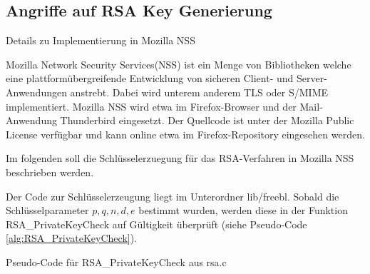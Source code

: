 
\newtext


\subsection{Angriffe auf RSA Key Generierung}

Details zu Implementierung in Mozilla NSS

Mozilla Network Security Services(NSS) ist ein Menge von Bibliotheken welche eine plattformübergreifende Entwicklung von sicheren Client- und Server-Anwendungen anstrebt. Dabei wird unterem anderem TLS oder S/MIME implementiert. Mozilla NSS wird etwa im Firefox-Browser und der Mail-Anwendung Thunderbird eingesetzt.
Der Quellcode ist unter der Mozilla Public License verfügbar und kann online etwa im Firefox-Repository \cite{MozillaDXR} eingesehen werden.

Im folgenden soll die Schlüsselerzuegung für das RSA-Verfahren in Mozilla NSS beschrieben werden.

Der Code zur Schlüsselerzeugung liegt im Unterordner lib/freebl. Sobald die Schlüsselparameter $p,q,n,d,e$ bestimmt wurden, werden diese in der Funktion RSA_PrivateKeyCheck auf Gültigkeit überprüft (siehe Pseudo-Code \ref{alg:RSA_PrivateKeyCheck}).

\begin{algorithm}[h]
\DontPrintSemicolon
\caption{Pseudo-Code für RSA_PrivateKeyCheck aus rsa.c}
\label{alg:RSA_PrivateKeyCheck}

\end{algorithm}


%

